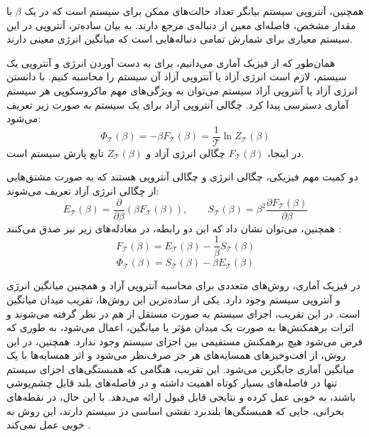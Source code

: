 همچنین، آنتروپی سیستم بیانگر تعداد حالت‌های ممکن برای سیستم است که در یک
\( \beta \)
با مقدار مشخص، فاصله‌ای معین از دنباله‌ی مرجع دارند.
به بیان ساده‌تر، آنتروپی در این سیستم معیاری برای شمارش تمامی دنباله‌هایی است که میانگین انرژی معینی دارند.

همان‌طور که از فیزیک آماری می‌دانیم، برای به دست آوردن انرژی و آنتروپی یک سیستم، لازم است انرژی آزاد یا آنتروپی آزاد آن سیستم را محاسبه کنیم.
با دانستن انرژی آزاد یا آنتروپی آزاد سیستم می‌توان به ویژگی‌های مهم ماکروسکوپی هر سیستم آماری دسترسی پیدا کرد.
چگالی آنتروپی آزاد برای یک سیستم به صورت زیر تعریف می‌شود:
\begin{equation}
    \Phi_{\mathcal{T}}(\beta) = -\beta F_{\mathcal{T}}(\beta) = \frac{1}{\mathcal{T}} \ln Z_{\mathcal{T}}(\beta)
\end{equation}
در اینجا،
\( F_{\mathcal{T}}(\beta) \)
چگالی انرژی آزاد و
\( Z_{\mathcal{T}}(\beta) \)
تابع پارش سیستم است.

دو کمیت مهم فیزیکی، چگالی انرژی و چگالی آنتروپی هستند که به صورت مشتق‌هایی از چگالی انرژی آزاد تعریف می‌شوند:
\begin{equation*}
    E_{\mathcal{T}}(\beta) = \frac{\partial}{\partial \beta} (\beta F_{\mathcal{T}}(\beta)), \qquad S_{\mathcal{T}}(\beta) = \beta^{2} \frac{\partial F_{\mathcal{T}}(\beta)}{\partial \beta}
\end{equation*}
همچنین، می‌توان نشان داد که این دو رابطه، در معادله‌های زیر نیز صدق می‌کنند
\cite{mezard2009}:
\begin{equation}
    F_{\mathcal{T}}(\beta) = E_{\mathcal{T}}(\beta) - \frac{1}{\beta} S_{\mathcal{T}}(\beta)
\end{equation}
\begin{equation}
    \Phi_{\mathcal{T}}(\beta) = S_{\mathcal{T}}(\beta) - \beta E_{\mathcal{T}}(\beta)
\end{equation}

در فیزیک آماری، روش‌های متعددی برای محاسبه آنتروپی آزاد و همچنین میانگین انرژی و آنتروپی سیستم وجود دارد.
یکی از ساده‌ترین این روش‌ها، تقریب میدان میانگین است.
در این تقریب، اجزای سیستم به صورت مستقل از هم در نظر گرفته می‌شوند و اثرات برهمکنش‌ها به صورت یک میدان مؤثر یا میانگین، اعمال می‌شود، به طوری که فرض می‌شود هیچ برهمکنش مستقیمی بین اجزای سیستم وجود ندارد.
همچنین، در این روش، از افت‌وخیزهای همسایه‌های هر جز صرف‌نظر می‌شود و اثر همسایه‌ها با یک میانگین آماری جایگزین می‌شود.
این تقریب، هنگامی که همبستگی‌های اجزای سیستم تنها در فاصله‌های بسیار کوتاه اهمیت داشته و در فاصله‌های بلند قابل چشم‌پوشی باشند، به خوبی عمل کرده و نتایجی قابل قبول ارائه می‌دهد.
با این حال، در نقطه‌های بحرانی، جایی که همبستگی‌ها بلندبرد نقشی اساسی در سیستم دارند، این روش به خوبی عمل نمی‌کند
\cite{weiss1907,chandler1987,kadanoff2009}.

